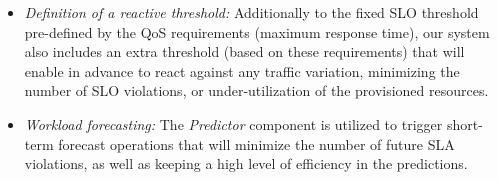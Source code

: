 \begin{itemize}



\item \emph{Definition of a reactive threshold:} Additionally to the fixed SLO threshold pre-defined by the QoS requirements (maximum response time), our system also includes an extra threshold (based on these requirements) that will enable in advance to react against any traffic variation, minimizing the number of SLO violations, or under-utilization of the provisioned resources. %


\item \emph{Workload forecasting: }  The \emph{Predictor} component is utilized to trigger short-term forecast operations that will minimize the number of future SLA violations, as well as keeping a high level of efficiency in the predictions. 
\end{itemize}

